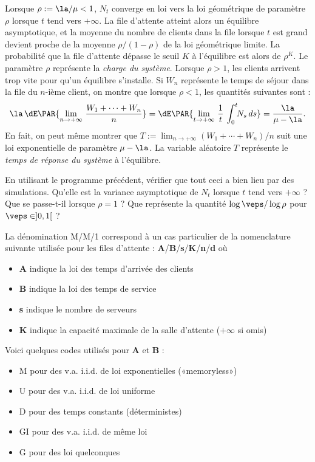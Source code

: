{{Lorsque $\rho:=\la/\mu<1$, $N_t$ converge en loi vers la loi géométrique de
paramètre $\rho$ lorsque $t$ tend vers $+\infty$. La file d'attente atteint
alors un équilibre asymptotique, et la moyenne du nombre de clients dans la
file lorsque $t$ est grand devient proche de la moyenne $\rho/(1-\rho)$ de la
loi géométrique limite.  La probabilité que la file d'attente dépasse le seuil
$K$ à l'équilibre est alors de $\rho^K$. Le paramètre $\rho$ représente la
\emph{charge du système}. Lorsque $\rho>1$, les clients arrivent trop vite
pour qu'un équilibre s'installe. Si $W_n$ représente le temps de séjour dans
la file du $n$-ième client, on montre que lorsque $\rho<1$, les quantités
suivantes sont  :
$$
\la\,\dE\PAR{\lim_{n\to+\infty}\,\frac{W_1+\cdots+W_n}{n}}
=\dE\PAR{\lim_{t\to+\infty}\,\frac{1}{t}\,\int_0^t\!\!N_s\,ds}
=\frac{\la}{\mu-\la}.
$$
En fait, on peut même montrer que
$T:=\lim_{n\to+\infty}(W_1+\cdots+W_n)/n$ suit une loi exponentielle
de paramètre $\mu-\la$. La variable aléatoire $T$ représente le
\emph{temps de réponse du système} à l'équilibre.

\begin{exo}
  En utilisant le programme \ML{} précédent, vérifier que tout ceci a
  bien lieu par des simulations. Qu'elle est la variance asymptotique
  de $N_t$ lorsque $t$ tend vers $+\infty$ ?  Que se passe-t-il
  lorsque $\rho=1$ ?  Que représente la quantité $\log \veps / \log
  \rho$ pour $\veps \in]0,1[$ ?
\end{exo}

La dénomination M/M/1 correspond à un cas particulier de la
nomenclature suivante utilisée pour les files d'attente :
\textbf{A}/\textbf{B}/\textbf{s}/\textbf{K}/\textbf{n}/\textbf{d} où
\begin{itemize}
\item \textbf{A} indique la loi des temps d'arrivée des clients
\item \textbf{B} indique la loi des temps de service
\item \textbf{s} indique le nombre de serveurs
\item \textbf{K} indique la capacité maximale de la salle d'attente ($+\infty$ si
  omis)
\end{itemize}
Voici quelques codes utilisés pour \textbf{A} et \textbf{B} :
\begin{itemize}
\item M pour des v.a. i.i.d. de loi exponentielles («memoryless»)
\item U pour des v.a. i.i.d. de loi uniforme
\item D pour des temps constants (déterministes)
\item GI pour des v.a. i.i.d. de même loi
\item G pour des loi quelconques
\end{itemize}

}}
